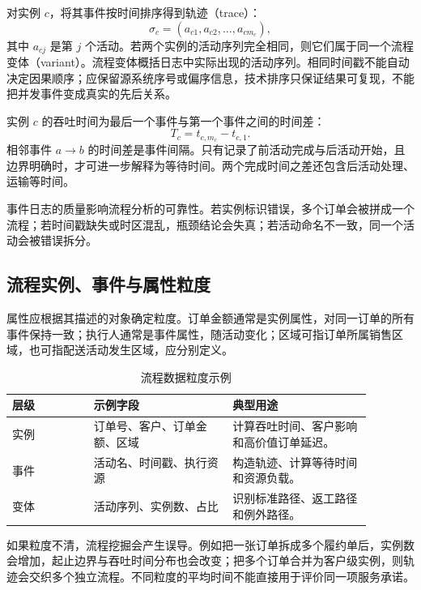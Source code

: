 对实例 \(c\)，将其事件按时间排序得到轨迹（trace）：
\[
  \sigma_c=(a_{c1},a_{c2},\ldots,a_{cm_c}),
\]
其中 \(a_{cj}\) 是第 \(j\) 个活动。若两个实例的活动序列完全相同，则它们属于同一个流程变体（variant）。流程变体概括日志中实际出现的活动序列。相同时间戳不能自动决定因果顺序；应保留源系统序号或偏序信息，技术排序只保证结果可复现，不能把并发事件变成真实的先后关系。

\begin{definition}[吞吐时间]
实例 \(c\) 的吞吐时间为最后一个事件与第一个事件之间的时间差：
\[
  T_c=t_{c,m_c}-t_{c,1}.
\]
相邻事件 \(a\rightarrow b\) 的时间差是事件间隔。只有记录了前活动完成与后活动开始，且边界明确时，才可进一步解释为等待时间。两个完成时间之差还包含后活动处理、运输等时间。
\end{definition}

事件日志的质量影响流程分析的可靠性。若实例标识错误，多个订单会被拼成一个流程；若时间戳缺失或时区混乱，瓶颈结论会失真；若活动命名不一致，同一个活动会被错误拆分。

\subsection{流程实例、事件与属性粒度}

属性应根据其描述的对象确定粒度。订单金额通常是实例属性，对同一订单的所有事件保持一致；执行人通常是事件属性，随活动变化；区域可指订单所属销售区域，也可指配送活动发生区域，应分别定义。

\begin{table}[htbp]
\centering
\caption{流程数据粒度示例}
\begin{tabular}{P{0.20\linewidth}P{0.34\linewidth}P{0.34\linewidth}}
\toprule
{}
层级 & 示例字段 & 典型用途\\
\midrule

实例 & 订单号、客户、订单金额、区域 & 计算吞吐时间、客户影响和高价值订单延迟。\\
事件 & 活动名、时间戳、执行资源 & 构造轨迹、计算等待时间和资源负载。\\
变体 & 活动序列、实例数、占比 & 识别标准路径、返工路径和例外路径。\\
\bottomrule
\end{tabular}
\end{table}

如果粒度不清，流程挖掘会产生误导。例如把一张订单拆成多个履约单后，实例数会增加，起止边界与吞吐时间分布也会改变；把多个订单合并为客户级实例，则轨迹会交织多个独立流程。不同粒度的平均时间不能直接用于评价同一项服务承诺。


